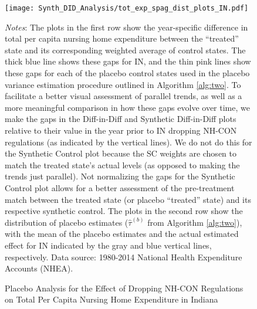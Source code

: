 \documentclass[../Main.tex]{subfiles}
\begin{document}
\newpage
\begin{figure}[t]
	\begin{center}
	\caption{\label{fig: tot_exp_spag_plots_in} \centering Placebo Analysis for the Effect of Dropping NH-CON Regulations on Total Per Capita Nursing Home Expenditure in Indiana}
    \texttt{[image: Synth\_DID\_Analysis/tot\_exp\_spag\_dist\_plots\_IN.pdf]}
    \end{center}
    \footnotesize
		\textit{Notes}: The plots in the first row show the year-specific difference in total per capita nursing home expenditure between the ``treated'' state and its corresponding weighted average of control states. The thick blue line shows these gaps for IN, and the thin pink lines show these gaps for each of the placebo control states used in the placebo variance estimation procedure outlined in Algorithm \ref{alg:two}. To facilitate a better visual assessment of parallel trends, as well as a more meaningful comparison in how these gaps evolve over time, we make the gaps in the Diff-in-Diff and Synthetic Diff-in-Diff plots relative to their value in the year prior to IN dropping NH-CON regulations (as indicated by the vertical lines). We do not do this for the Synthetic Control plot because the SC weights are chosen to match the treated state's actual levels (as opposed to making the trends just parallel). Not normalizing the gaps for the Synthetic Control plot allows for a better assessment of the pre-treatment match between the treated state (or placebo ``treated'' state) and its respective synthetic control. The plots in the second row show the distribution of placebo estimates ($\hat{\tau}^{(b)}$ from Algorithm \ref{alg:two}), with the mean of the placebo estimates and the actual estimated effect for IN indicated by the gray and blue vertical lines, respectively. Data source: 1980-2014 National Health Expenditure Accounts (NHEA).
\end{figure}
\clearpage
\end{document}
